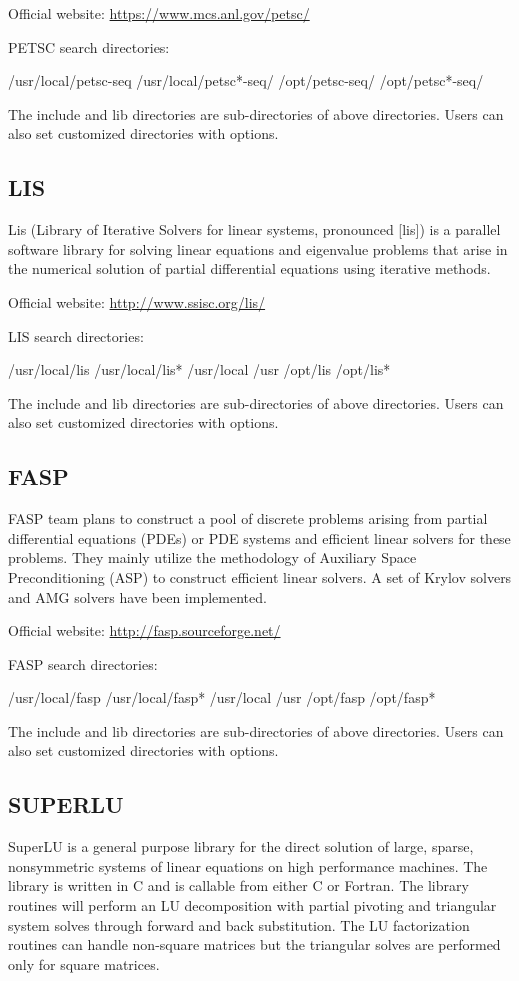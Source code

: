 Official website: \url{https://www.mcs.anl.gov/petsc/}

PETSC search directories:
\begin{evb}
/usr/local/petsc-seq
/usr/local/petsc*-seq/
/opt/petsc-seq/
/opt/petsc*-seq/
\end{evb}

The include and lib directories are sub-directories of above directories. Users can also set customized directories with options.

\subsection{LIS}
Lis (Library of Iterative Solvers for linear systems, pronounced [lis]) is a parallel software library for solving linear equations and eigenvalue problems that arise in the numerical solution of partial differential equations using iterative methods.

Official website: \url{http://www.ssisc.org/lis/}

LIS search directories:
\begin{evb}
/usr/local/lis
/usr/local/lis*
/usr/local
/usr
/opt/lis 
/opt/lis*
\end{evb}

The include and lib directories are sub-directories of above directories. Users can also set customized directories with options.

\subsection{FASP}
FASP team plans to construct a pool of discrete problems arising from partial differential equations (PDEs) or PDE systems and efficient linear solvers for these problems. They mainly utilize the methodology of Auxiliary Space Preconditioning (ASP) to construct efficient linear solvers. A set of Krylov solvers and AMG solvers have been implemented. 

Official website: \url{http://fasp.sourceforge.net/}

FASP search directories:
\begin{evb}
/usr/local/fasp
/usr/local/fasp*
/usr/local
/usr
/opt/fasp 
/opt/fasp*
\end{evb}
The include and lib directories are sub-directories of above directories. Users can also set customized directories with options.

\subsection{SUPERLU}
SuperLU is a general purpose library for the direct solution of large, sparse, nonsymmetric systems of linear equations on high performance machines. The library is written in C and is callable from either C or Fortran. The library routines will perform an LU decomposition with partial pivoting and triangular system solves through forward and back substitution. The LU factorization routines can handle non-square matrices but the triangular solves are performed only for square matrices.

